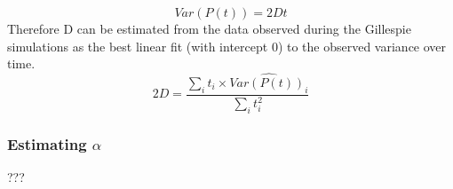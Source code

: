 \documentclass[]{article}
\begin{document}
\begin{equation} \label{eq:D} 
	Var(P(t)) = 2Dt
\end{equation} 
Therefore D can be estimated from the data observed during the Gillespie simulations as the best linear fit (with intercept 0) to the observed variance over time. 
\begin{equation} \label{eq:D_fit} 
	2D = \frac{\sum_{i} t_i \times \hat{Var(P(t))_i}}{\sum_{i} t_i^2}
\end{equation} 

\subsubsection{Estimating $\alpha$}
???
\end{document}

